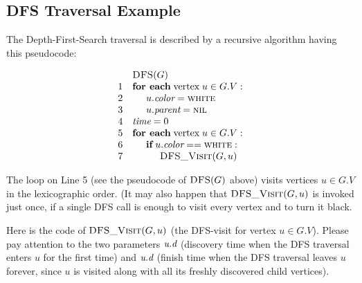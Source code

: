 \documentclass[a4paper,12pt]{article}
\begin{document}
\subsection{DFS Traversal Example}

The Depth-First-Search traversal is described by a 
recursive algorithm having this pseudocode:

$$\begin{array}{rl}
 & \text{\sc DFS}(G)\\
1 & \text{\bf for each}\;\text{vertex}\;u \in G.V:\\
2 & \hspace{.5cm} u.\text{\em color} = \text{\sc white}\\
3 & \hspace{.5cm} u.\text{\em parent} = \text{\sc nil}\\
4 & \text{\em time} = 0\\
5 & \text{\bf for each}\;\text{vertex}\;u \in G.V:\\
6 & \hspace{.5cm} \text{\bf if}\;u.\text{\em color} == \text{\sc white}:\\
7 & \hspace{1cm} \text{\sc DFS\textunderscore{}Visit}(G,u)\\
\end{array}$$

The loop on Line 5 (see the pseudocode of
$\text{\sc DFS}(G)$ above) visits vertices $u \in G.V$ 
in the lexicographic order. (It may also happen that 
$\text{\sc DFS\textunderscore{}Visit}(G,u)$ is invoked just once, if
a single DFS call is enough to visit every vertex and to turn it black.

Here is the code of $\text{\sc DFS\textunderscore{}Visit}(G,u)$ (the DFS-visit 
for vertex $u \in G.V$). Please pay attention to the two parameters 
$\text{\em u.d}$ (discovery time \textendash{} when the DFS 
traversal enters $u$ for the first time) and $\text{\em u.d}$ (finish time \textendash{}
when the DFS traversal leaves $u$ forever, since $u$ is visited along with all 
its freshly discovered child vertices). 
\end{document}
